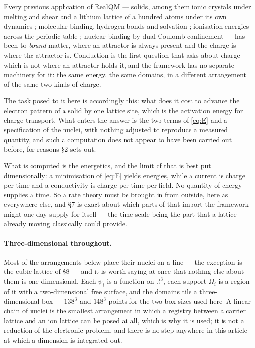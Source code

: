 \documentclass[11pt]{article}
\begin{document}
Every previous application of RealQM --- solids, among them ionic crystals under melting and shear
and a lithium lattice of a hundred atoms under its own dynamics \cite{code}; molecular binding,
hydrogen bonds and solvation \cite{realqm,realqmbook}; ionisation energies across the periodic table
\cite{realatoms}; nuclear binding by dual Coulomb confinement \cite{realnucleus} --- has been to
\emph{bound} matter, where an attractor is always present and the charge is where the attractor is.
Conduction is the first question that asks about charge which is not where an attractor holds it, and
the framework has no separate machinery for it: the same energy, the same domains, in a different
arrangement of the same two kinds of charge.

The task posed to it here is accordingly this: what does it cost to advance the electron pattern of
a solid by one lattice site, which is the activation energy for charge transport. What enters the
answer is the two terms of \eqref{eq:E} and a specification of the nuclei, with nothing adjusted to
reproduce a measured quantity, and such a computation does not appear to have been carried out
before, for reasons \S2 sets out.

What is computed is the energetics, and the limit of that is best put dimensionally: a minimisation
of \eqref{eq:E} yields energies, while a current is charge per time and a conductivity is charge per
time per field. No quantity of energy supplies a time. So a rate theory must be brought in from
outside, here as everywhere else, and \S7 is exact about which parts of that import the framework
might one day supply for itself --- the time scale being the part that a lattice already moving
classically could provide.

\paragraph{Three-dimensional throughout.} Most of the arrangements below place their nuclei on a
line --- the exception is the cubic lattice of \S8 --- and it is worth saying at once that nothing
else about them is one-dimensional. Each $\psi_i$ is
a function on $\mathbb{R}^3$, each support $\Omega_i$ is a region of it with a two-dimensional
free surface, and the domains tile a three-dimensional box --- $138^3$ and $148^3$ points for
the two box sizes used here. A linear chain of nuclei is the smallest arrangement in which a registry
between a carrier lattice and an ion lattice can be posed at all, which is why it is used; it is
not a reduction of the electronic problem, and there is no step anywhere in this article at
which a dimension is integrated out.
\end{document}
